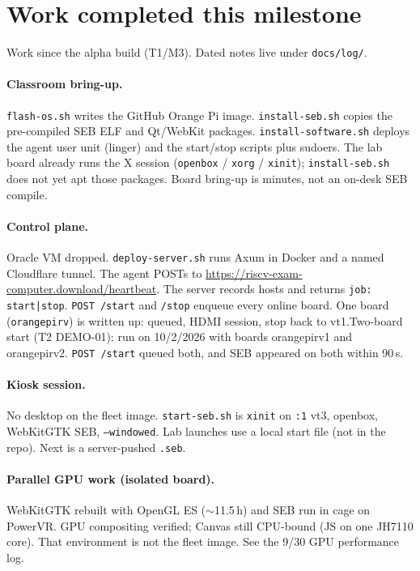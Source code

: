 \documentclass[11pt]{article}
\begin{document}
\section{Work completed this milestone}

Work since the alpha build (T1/M3). Dated notes live under \texttt{docs/log/}.

\paragraph{Classroom bring-up.}
\texttt{flash-os.sh} writes the GitHub Orange Pi image.
\texttt{install-seb.sh} copies the pre-compiled SEB ELF and Qt/WebKit packages.
\texttt{install-software.sh} deploys the agent user unit (linger) and the start/stop scripts plus sudoers.
The lab board already runs the X session (\texttt{openbox} / \texttt{xorg} / \texttt{xinit}); \texttt{install-seb.sh} does not yet apt those packages.
Board bring-up is minutes, not an on-desk SEB compile.

\paragraph{Control plane.}
Oracle VM dropped. \texttt{deploy-server.sh} runs Axum in Docker and a named Cloudflare tunnel. The agent POSTs to \url{https://riscv-exam-computer.download/heartbeat}. The server records hosts and returns \texttt{job: start|stop}. \texttt{POST /start} and \texttt{/stop} enqueue every online board. One board (\texttt{orangepirv}) is written up: queued, HDMI session, stop back to vt1.Two-board start (T2 DEMO-01): run on 10/2/2026 with boards orangepirv1 and orangepirv2. \texttt{POST /start} queued both, and SEB appeared on both within 90\,s.

\paragraph{Kiosk session.}
No desktop on the fleet image. \texttt{start-seb.sh} is \texttt{xinit} on \texttt{:1} vt3, openbox, WebKitGTK SEB, \texttt{--windowed}. Lab launches use a local start file (not in the repo). Next is a server-pushed \texttt{.seb}.

\paragraph{Parallel GPU work (isolated board).}
WebKitGTK rebuilt with OpenGL ES ($\sim$11.5\,h) and SEB run in cage on PowerVR. GPU compositing verified; Canvas still CPU-bound (JS on one JH7110 core). That environment is not the fleet image. See the 9/30 GPU performance log.
\end{document}
